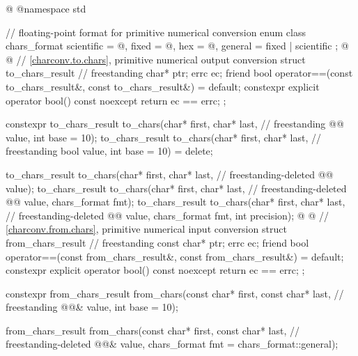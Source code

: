 %
\begin{codeblock}
@%
%
%
%
%
%
@namespace std {
  // floating-point format for primitive numerical conversion
  enum class chars_format {
    scientific = @\unspec@,
    fixed = @\unspec@,
    hex = @\unspec@,
    general = fixed | scientific
  };
@%
%
%
@
  // \ref{charconv.to.chars}, primitive numerical output conversion
  struct to_chars_result {                                              // freestanding
    char* ptr;
    errc ec;
    friend bool operator==(const to_chars_result&, const to_chars_result&) = default;
    constexpr explicit operator bool() const noexcept { return ec == errc{}; }
  };

  constexpr to_chars_result to_chars(char* first, char* last,           // freestanding
                                     @@ value, int base = 10);
  to_chars_result to_chars(char* first, char* last,                     // freestanding
                           bool value, int base = 10) = delete;

  to_chars_result to_chars(char* first, char* last,                     // freestanding-deleted
                           @@ value);
  to_chars_result to_chars(char* first, char* last,                     // freestanding-deleted
                           @@ value, chars_format fmt);
  to_chars_result to_chars(char* first, char* last,                     // freestanding-deleted
                           @@ value, chars_format fmt, int precision);
@%
%
%
@
  // \ref{charconv.from.chars}, primitive numerical input conversion
  struct from_chars_result {                                            // freestanding
    const char* ptr;
    errc ec;
    friend bool operator==(const from_chars_result&, const from_chars_result&) = default;
    constexpr explicit operator bool() const noexcept { return ec == errc{}; }
  };

  constexpr from_chars_result from_chars(const char* first, const char* last,   // freestanding
                                         @@& value, int base = 10);

  from_chars_result from_chars(const char* first, const char* last,     // freestanding-deleted
                               @@& value,
                               chars_format fmt = chars_format::general);
}
\end{codeblock}

